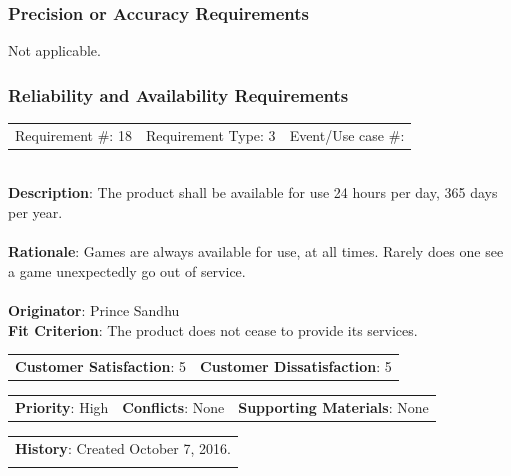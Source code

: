 \documentclass[12pt, titlepage]{article}
\begin{document}
\subsubsection{Precision or Accuracy Requirements}
Not applicable.
\newpage
\subsubsection{Reliability and Availability Requirements}

\begin{reqbox}

\begin{tabular}{lll}
Requirement \#: 18 & Requirement Type: 3 & Event/Use case \#: \\
\end{tabular} \\

\textbf{Description}: The product shall be available for use 24 hours per day, 365 days per year. \\ \\
\textbf{Rationale}: Games are always available for use, at all times. Rarely does one see a game 						unexpectedly go out of service. \\ \\
\textbf{Originator}: Prince Sandhu \\
\textbf{Fit Criterion}: The product does not cease to provide its services. \\

\begin{tabular}{ll}
\textbf{Customer Satisfaction}: 5 & \textbf{Customer Dissatisfaction}: 5 \\
\end{tabular}

\begin{tabular}{lll}
\textbf{Priority}: High & \textbf{Conflicts}: None & \textbf{Supporting Materials}: None \\
\end{tabular}

\begin{tabular}{l}
\textbf{History}: Created October 7, 2016.\\ \\
\end{tabular} \\

\end{reqbox}
\end{document}
